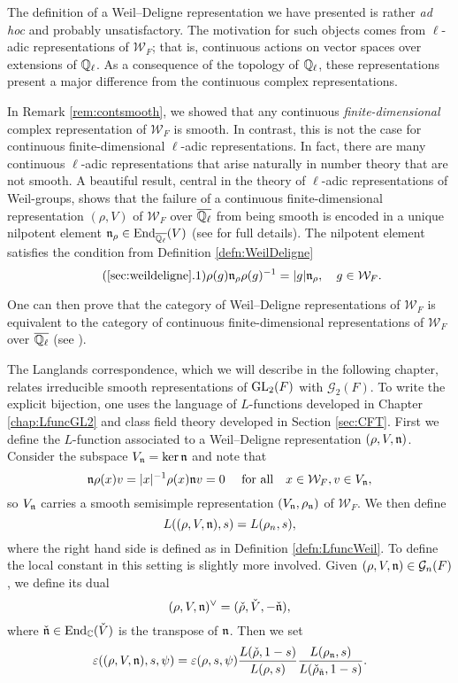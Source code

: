 \begin{rem}
    The definition of a Weil--Deligne representation we have presented is rather \textit{ad hoc} and probably unsatisfactory. The motivation for such objects comes from $\ell$-adic representations of $\mathcal{W}_F$; that is, continuous actions on vector spaces over extensions of $\mathbb{Q}_\ell$. As a consequence of the topology of $\mathbb{Q}_\ell$, these representations present a major difference from the continuous complex representations. 

    In Remark \ref{rem:contsmooth}, we showed that any continuous \textit{finite-dimensional} complex representation of $\mathcal{W}_F$ is smooth. In contrast, this is not the case for continuous finite-dimensional $\ell$-adic representations. In fact, there are many continuous $\ell$-adic representations that arise naturally in number theory that are not smooth. A beautiful result, central in the theory of $\ell$-adic representations of Weil-groups, shows that the failure of a continuous finite-dimensional representation $(\rho,V)$ of $\mathcal{W}_F$ over $\overline{\mathbb{Q}_\ell}$ from being smooth is encoded in a unique nilpotent element $\mathfrak{n}_\rho\in\mathrm{End}_{\overline{\mathbb{Q}_\ell}}(V)$ (see \cite[Theorem 32.5]{BH1} for full details). The nilpotent element satisfies the condition from Definition \ref{defn:WeilDeligne}
    \begin{equation}\label{eqn:Vnsubspace}\tag{\ref{sec:weildeligne}.1}
        \rho(g)\nn_\rho\rho(g)^{-1}=|g|\nn_\rho,\quad g\in \mathcal{W}_F.
    \end{equation}

    One can then prove that the category of Weil--Deligne representations of $\mathcal{W}_F$ is equivalent to the category of continuous finite-dimensional representations of $\mathcal{W}_F$ over $\overline{\mathbb{Q}_\ell}$ (see \cite[Theorem 32.6]{BH1}). 
\end{rem}

The Langlands correspondence, which we will describe in the following chapter, relates irreducible smooth representations of $\mathrm{GL}_2(F)$ with $\mathcal{G}_2(F)$. To write the explicit bijection, one uses the language of $L$-functions developed in Chapter \ref{chap:LfuncGL2} and class field theory developed in Section \ref{sec:CFT}.
First we define the $L$-function associated to a Weil--Deligne representation $(\rho,V,\mathfrak{n})$. Consider the subspace $V_{\mathfrak{n}}=\ker\mathfrak{n}$ and note that 
$$\mathfrak{n}\rho(x)v=|x|^{-1}\rho(x)\mathfrak{n} v=0\quad\text{ for all}\quad x\in \mathcal{W}_F,v\in V_{\mathfrak{n}},$$
so $V_{\mathfrak{n}}$ carries a smooth semisimple representation $(V_{\mathfrak{n}},\rho_{\mathfrak{n}})$ of $\mathcal{W}_F$. We then define 
$$L((\rho,V,\mathfrak{n}),s)=L(\rho_n,s),$$
where the right hand side is defined as in Definition \ref{defn:LfuncWeil}. To define the local constant in this setting is slightly more involved. Given $(\rho,V,\mathfrak{n})\in\mathcal{G}_n(F)$, we define its dual
$$(\rho,V,\mathfrak{n})^\vee=(\check\rho,\check{V},-\check{\mathfrak{n}}),$$
where $\check{\mathfrak{n}}\in\mathrm{End}_{\mathbb{C}}(\check{V})$ is the transpose of $\mathfrak{n}$. Then we set
$$\varepsilon((\rho,V,\mathfrak{n}),s,\psi)=\varepsilon(\rho,s,\psi)\frac{L(\check{\rho},1-s)}{L(\rho,s)}\frac{L(\rho_{\mathfrak{n}},s)}{L(\check{\rho}_{\check{\mathfrak{n}}},1-s)}.$$

\newpage

